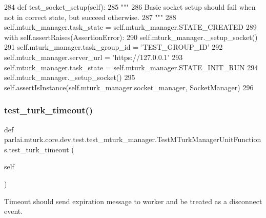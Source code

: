 \begin{DoxyCode}
284     \textcolor{keyword}{def }test\_socket\_setup(self):
285         \textcolor{stringliteral}{"""}
286 \textcolor{stringliteral}{        Basic socket setup should fail when not in correct state, but succeed otherwise.}
287 \textcolor{stringliteral}{        """}
288         self.mturk\_manager.task\_state = self.mturk\_manager.STATE\_CREATED
289         with self.assertRaises(AssertionError):
290             self.mturk\_manager.\_setup\_socket()
291         self.mturk\_manager.task\_group\_id = \textcolor{stringliteral}{'TEST\_GROUP\_ID'}
292         self.mturk\_manager.server\_url = \textcolor{stringliteral}{'https://127.0.0.1'}
293         self.mturk\_manager.task\_state = self.mturk\_manager.STATE\_INIT\_RUN
294         self.mturk\_manager.\_setup\_socket()
295         self.assertIsInstance(self.mturk\_manager.socket\_manager, SocketManager)
296 
\end{DoxyCode}
\mbox{\label{classparlai_1_1mturk_1_1core_1_1dev_1_1test_1_1test__mturk__manager_1_1TestMTurkManagerUnitFunctions_a19c8394ebe1f54d5cf9b1bcad6920ec9}} 
\subsubsection{\texorpdfstring{test\+\_\+turk\+\_\+timeout()}{test\_turk\_timeout()}}
{\footnotesize\ttfamily def parlai.\+mturk.\+core.\+dev.\+test.\+test\+\_\+mturk\+\_\+manager.\+Test\+M\+Turk\+Manager\+Unit\+Functions.\+test\+\_\+turk\+\_\+timeout (\begin{DoxyParamCaption}\item[{}]{self }\end{DoxyParamCaption})}

\begin{DoxyVerb}Timeout should send expiration message to worker and be treated as a disconnect
event.
\end{DoxyVerb}
 

